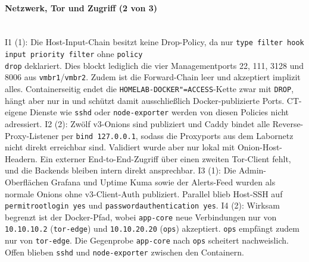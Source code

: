 \paragraph{Netzwerk, Tor und Zugriff (2 von 3)} \mbox{}\\
I1 (1): Die Host-Input-Chain besitzt keine Drop-Policy, da  nur
\texttt{type filter hook input priority filter} ohne
\texttt{policy \\drop} deklariert. Dies blockt lediglich die vier Managementports 22, 111,
3128 und 8006 aus \texttt{vmbr1}/\texttt{vmbr2}.
Zudem ist die Forward-Chain leer und akzeptiert implizit alles. 
Containerseitig endet die \texttt{HOMELAB-DOCKER"=ACCESS}-Kette zwar mit \texttt{DROP}, hängt aber nur in  und schützt damit ausschließlich Docker-publizierte Ports.
\ac{CT}-eigene Dienste wie \texttt{sshd} oder \texttt{node-exporter} werden von diesen Policies nicht adressiert.\cite{hostnftablesA,dockerfirewallA,selfauditA}
I2 (2): Zwölf v3-Onions sind publiziert und Caddy bindet alle Reverse-Proxy-Listener per \texttt{bind 127.0.0.1}, sodass die Proxyports aus dem Labornetz nicht direkt erreichbar sind.
Validiert wurde aber nur lokal mit Onion-Host-Headern.
Ein externer End-to-End-Zugriff über einen zweiten Tor-Client fehlt, und die Backends bleiben intern direkt ansprechbar.\cite{caddyfileA,runbookA,selfauditA}
I3 (1): Die Admin-Oberflächen Grafana und Uptime Kuma sowie der Alerts-Feed wurden als normale Onions ohne v3-Client-Auth publiziert. Parallel blieb Host-\ac{SSH} auf \texttt{permitrootlogin yes} und \texttt{passwordauthentication yes}.\cite{runbookA,selfauditA}
I4 (2): Wirksam begrenzt ist der Docker-Pfad, wobei \texttt{app-core} neue Verbindungen nur von \texttt{10.10.10.2} (\texttt{tor-edge}) und \texttt{10.10.20.20} (\texttt{ops}) akzeptiert.
\texttt{ops} empfängt zudem nur von \texttt{tor-edge}.
Die Gegenprobe \texttt{app-core} nach \texttt{ops} scheitert nachweislich.
Offen blieben \texttt{sshd} und \texttt{node-exporter} zwischen den Containern.\cite{dockerfirewallA,runbookA,selfauditA}

